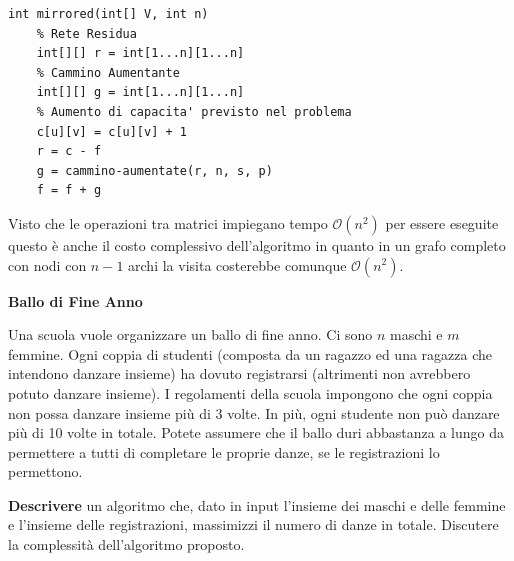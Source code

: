 \documentclass[../cheatSheetAlgoritmi.tex]{subfiles}
\begin{document}
\begin{lstlisting}[caption=Aggiornamento Flusso Massimo]
int mirrored(int[] V, int n)
	% Rete Residua
	int[][] r = int[1...n][1...n]
	% Cammino Aumentante
	int[][] g = int[1...n][1...n]
	% Aumento di capacita' previsto nel problema 
	c[u][v] = c[u][v] + 1
	r = c - f
	g = cammino-aumentate(r, n, s, p)
	f = f + g
\end{lstlisting}
Visto che le operazioni tra matrici impiegano tempo $\mathcal{O}(n^{2})$ per essere eseguite questo è anche il costo complessivo dell'algoritmo in quanto in un grafo completo con nodi con $n-1$ archi la visita costerebbe comunque $\mathcal{O}(n^{2})$.

\bigskip

\textbf{Ballo di Fine Anno}

Una scuola vuole organizzare un ballo di fine anno. Ci sono $n$ maschi e $m$ femmine. Ogni coppia di studenti (composta da un ragazzo ed una ragazza che intendono danzare insieme) ha dovuto registrarsi (altrimenti non avrebbero potuto danzare insieme). I regolamenti della scuola impongono che ogni coppia non possa danzare insieme più di 3 volte. In più, ogni studente non può danzare più di 10 volte in totale. Potete assumere che il ballo duri abbastanza a lungo da permettere a tutti di completare le proprie danze, se le registrazioni lo permettono.

\textbf{Descrivere} un algoritmo che, dato in input l’insieme dei maschi e delle femmine e l’insieme delle registrazioni, massimizzi il numero di danze in totale. Discutere la complessità dell’algoritmo proposto.
\end{document}
